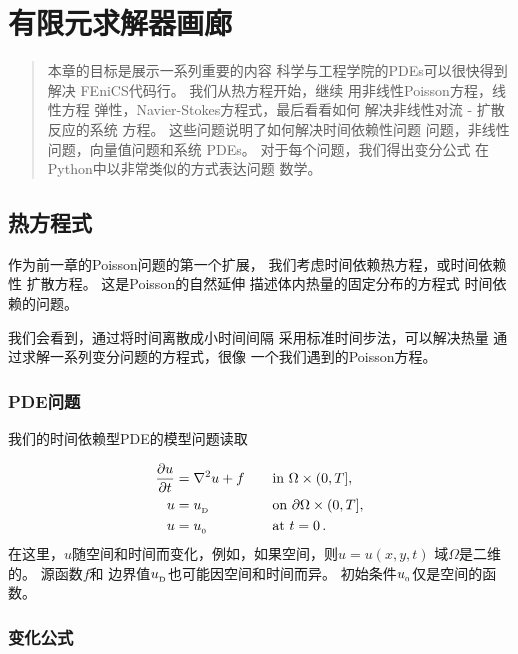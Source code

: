 \chapter{有限元求解器画廊}
\label{ch:gallery}

\begin{quote}
本章的目标是展示一系列重要的内容
科学与工程学院的PDEs可以很快得到解决
FEniCS代码行。 我们从热方程开始，继续
用非线性Poisson方程，线性方程
弹性，Navier-Stokes方程式，最后看看如何
解决非线性对流 - 扩散反应的系统
方程。 这些问题说明了如何解决时间依赖性问题
问题，非线性问题，向量值问题和系统
PDEs。 对于每个问题，我们得出变分公式
在Python中以非常类似的方式表达问题
数学。
\end{quote}

\section{热方程式}
\label{ch:fundamentals:diffusion}


作为前一章的Poisson问题的第一个扩展，
我们考虑时间依赖热方程，或时间依赖性
扩散方程。 这是Poisson的自然延伸
描述体内热量的固定分布的方程式
时间依赖的问题。

我们会看到，通过将时间离散成小时间间隔
采用标准时间步法，可以解决热量
通过求解一系列变分问题的方程式，很像
一个我们遇到的Poisson方程。

\subsection{PDE问题}

我们的时间依赖型PDE的模型问题读取

\begin{alignat}{2}
{\partial u\over\partial t} &= \nabla^2 u + f \quad &&\hbox{in }\Omega\times(0, T],
\label{ch:diffusion0:pde1}\\
u &= u_{_\mathrm{D}} &&\hbox{on } \partial \Omega\times(0, T],
\label{ch:diffusion0:pde1:bc}\\
u &= u_{_0} &&\mbox{at } t=0\thinspace .
\label{ch:diffusion0:pde1:ic}
\end{alignat}
在这里，$u$随空间和时间而变化，例如，如果空间，则$u=u(x,y,t)$
域$\Omega$是二维的。 源函数$f$和
边界值$u_{_\mathrm{D}}$也可能因空间和时间而异。
初始条件$u_{_0}$仅是空间的函数。

\subsection{变化公式}
\label{ftut:timedep:diffusion1}

